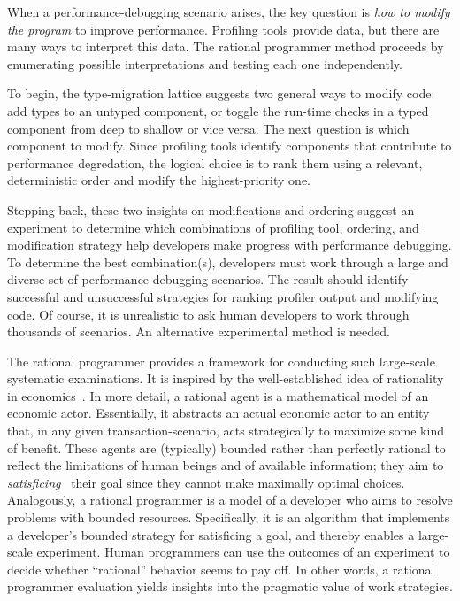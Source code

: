 
When a performance-debugging scenario arises, the key question is \emph{how
to modify the program} to improve performance.
Profiling tools provide data, but there are many ways to interpret this data.
The rational programmer method proceeds by enumerating possible
interpretations and testing each one independently.

To begin, the type-migration lattice suggests two general ways to modify code:
add types to an untyped component, or toggle the run-time checks in a typed
component from deep to shallow or vice versa.
The next question is which component to modify.
Since profiling tools identify components that contribute to performance
degredation, the logical choice is to rank them using a relevant, deterministic
order and modify the highest-priority one.

Stepping back, these two insights on modifications and ordering suggest
an experiment to determine which combinations of profiling tool,
ordering, and modification strategy help developers make progress with
performance debugging.
To determine the best combination(s), developers must work through a
large and diverse set of performance-debugging scenarios.
The result should identify successful and unsuccessful strategies for ranking
profiler output and modifying code.
Of course, it is unrealistic to ask human developers to work through thousands
of scenarios. An alternative experimental method is needed.

The rational programmer provides a framework for conducting such
large-scale systematic examinations.
It is inspired by the well-established idea of rationality in
economics~\cite{mill1874essays, henrich2001search}.  In more detail, a
rational agent is a mathematical model of an economic actor. Essentially, it
abstracts an actual economic actor to an entity that, in any given
transaction-scenario, acts strategically to maximize some kind of benefit.
These agents are (typically) bounded rather than perfectly rational
to reflect the limitations of human beings and of available information;
they aim to \emph{satisficing}~\cite{hs:satisfice} their goal since
they cannot make maximally optimal choices.
Analogously, a rational programmer is a model of a developer who aims to
resolve problems with bounded resources.
Specifically, it is an algorithm that implements a developer's bounded
strategy for {satisficing} a goal, and thereby enables a large-scale
experiment.
Human programmers can use the outcomes of an experiment to decide whether
``rational'' behavior seems to pay off.
In other words, a rational programmer evaluation yields insights into the
pragmatic value of work strategies.

